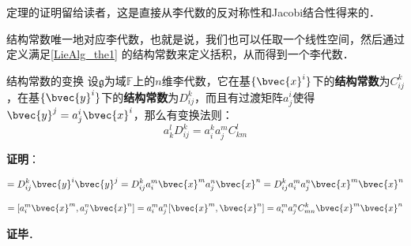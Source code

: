 定理的证明留给读者，这是直接从李代数的反对称性和Jacobi结合性得来的．

结构常数唯一地对应李代数，也就是说，我们也可以任取一个线性空间，然后通过定义满足\autoref{LieAlg_the1} 的结构常数来定义括积，从而得到一个李代数．

\begin{theorem}{结构常数的变换}
设$\mathfrak{g}$为域$\mathbb{F}$上的$n$维李代数，它在基$\{\bvec{x}^i\}$下的\textbf{结构常数}为$C^k_{ij}$，在基$\{\bvec{y}^i\}$下的\textbf{结构常数}为$D^k_{ij}$，而且有过渡矩阵$a^i_j$使得$\bvec{y}^j=a^i_j\bvec{x}^i$，那么有变换法则：
\begin{equation}
a^l_kD^k_{ij}=a^k_ia^m_jC^l_{km}
\end{equation}

\end{theorem}

\textbf{证明}：

\begin{equation}
[\bvec{y}^i, \bvec{y}^j]=D^k_{ij}\bvec{y}^i\bvec{y}^j=D^k_{ij}a^m_i\bvec{x}^ma^n_j\bvec{x}^n=D^k_{ij}a^m_ia^n_j\bvec{x}^m\bvec{x}^n
\end{equation}

\begin{equation}
[\bvec{y}^i, \bvec{y}^j]=[a^m_i\bvec{x}^m, a^n_j\bvec{x}^n]=a^m_ia^n_j[\bvec{x}^m, \bvec{x}^n]=a^m_ia^n_jC^k_{mn}\bvec{x}^m\bvec{x}^n
\end{equation}

\textbf{证毕}．





